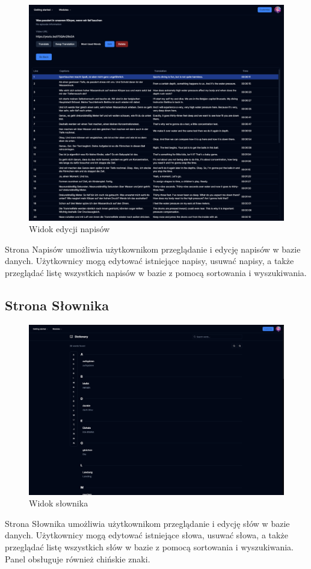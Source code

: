 \begin{figure}[H]
    \centering
    \includegraphics[width=1\textwidth]{IMAGE/SubtitlesSelected.png}
    \caption{Widok edycji napisów}
    \label{fig:Edycja napisów}
\end{figure}
Strona Napisów umożliwia użytkownikom przeglądanie i edycję napisów w bazie danych. Użytkownicy mogą edytować istniejące napisy, usuwać napisy, a także przeglądać listę wszystkich napisów w bazie z pomocą sortowania i wyszukiwania.

\subsection{Strona Słownika}

\begin{figure}[H]
    \centering
    \includegraphics[width=1\textwidth]{IMAGE/WordBank.png}
    \caption{Widok słownika}
    \label{fig:Słownik słów}
\end{figure}
Strona Słownika umożliwia użytkownikom przeglądanie i edycję słów w bazie danych. Użytkownicy mogą  edytować istniejące słowa, usuwać słowa, a także przeglądać listę wszystkich słów w bazie z pomocą sortowania i wyszukiwania. Panel obsługuje również chińskie znaki.
